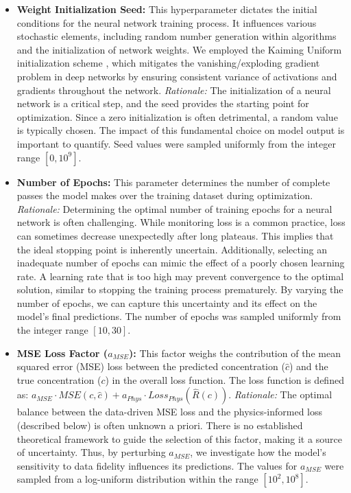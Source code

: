 \begin{itemize}
    \item \textbf{Weight Initialization Seed:} This hyperparameter dictates the initial conditions for the neural network training process. It influences various stochastic elements, including random number generation within algorithms and the initialization of network weights. We employed the Kaiming Uniform initialization scheme \cite{he2015delving}, which mitigates the vanishing/exploding gradient problem in deep networks by ensuring consistent variance of activations and gradients throughout the network. \textit{Rationale:} The initialization of a neural network is a critical step, and the seed provides the starting point for optimization. Since a zero initialization is often detrimental, a random value is typically chosen. The impact of this fundamental choice on model output is important to quantify. Seed values were sampled uniformly from the integer range $[0, 10^9]$.
    \item \textbf{Number of Epochs:} This parameter determines the number of complete passes the model makes over the training dataset during optimization. \textit{Rationale:}  Determining the optimal number of training epochs for a neural network is often challenging. While monitoring loss is a common practice, loss can sometimes decrease unexpectedly after long plateaus. This implies that the ideal stopping point is inherently uncertain. Additionally, selecting an inadequate number of epochs can mimic the effect of a poorly chosen learning rate. A learning rate that is too high may prevent convergence to the optimal solution, similar to stopping the training process prematurely. By varying the number of epochs, we can capture this uncertainty and its effect on the model's final predictions. The number of epochs was sampled uniformly from the integer range $[10, 30]$.
    \item \textbf{MSE Loss Factor ($a_{MSE}$):} This factor weighs the contribution of the mean squared error (MSE) loss between the predicted concentration ($\hat{c}$) and the true concentration ($c$) in the overall loss function. The loss function is defined as: $a_{MSE} \cdot MSE(c, \hat{c}) + a_{Phys} \cdot Loss_{Phys}(\hat{R}(c))$. \textit{Rationale:} The optimal balance between the data-driven MSE loss and the physics-informed loss (described below) is often unknown a priori. There is no established theoretical framework to guide the selection of this factor, making it a source of uncertainty. Thus, by perturbing $a_{MSE}$, we investigate how the model's sensitivity to data fidelity influences its predictions. The values for $a_{MSE}$ were sampled from a log-uniform distribution within the range $[10^2, 10^8]$.

\end{itemize}
